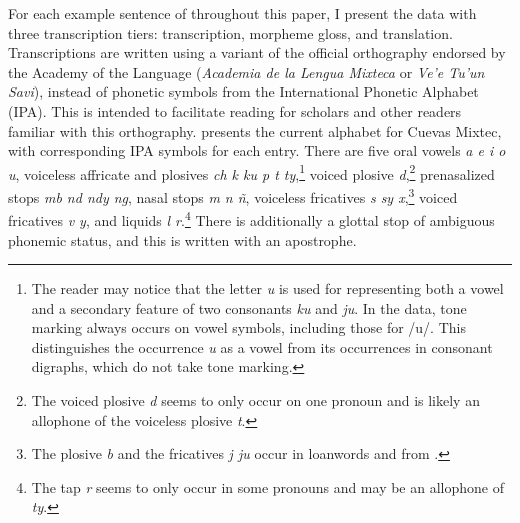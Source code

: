 \documentclass[output=paper,modfonts,nonflat]{langsci/langscibook}
\begin{document}
For each example sentence of  throughout this paper, I present the data with three transcription tiers: transcription, morpheme gloss, and translation.  Transcriptions are written using a variant of the official  orthography endorsed by the Academy of the  Language (\textit{Academia de la Lengua Mixteca} or \textit{Ve'e Tu'un Savi}), instead of phonetic symbols from the International Phonetic Alphabet (IPA).  This is intended to facilitate reading for  scholars and other readers familiar with this orthography.   presents the current alphabet for Cuevas Mixtec, with corresponding IPA symbols for each entry.  There are five oral vowels \textit{a e i o u}, voiceless affricate and plosives \textit{ch k ku p t ty},\footnote{The reader may notice that the letter \textit{u} is used for representing both a vowel and a secondary feature of two consonants \textit{ku} and \textit{ju}.  In the data, tone marking always occurs on vowel symbols, including those for /u/.  This distinguishes the occurrence \textit{u} as a vowel from its occurrences in consonant digraphs, which do not take tone marking.} voiced plosive \textit{d},\footnote{The voiced plosive \textit{d} seems to only occur on one pronoun and is likely an allophone of the voiceless plosive \textit{t}.} prenasalized stops \textit{mb nd ndy ng}, nasal stops \textit{m n \~n}, voiceless fricatives \textit{s sy x},\footnote{The plosive \textit{b} and the fricatives \textit{j ju} occur in loanwords and  from .} voiced fricatives \textit{v y}, and liquids \textit{l r}.\footnote{The tap \textit{r} seems to only occur in some pronouns and may be an allophone of \textit{ty}.}  There is additionally a glottal stop of ambiguous phonemic status, and this is written with an apostrophe.
\end{document}
